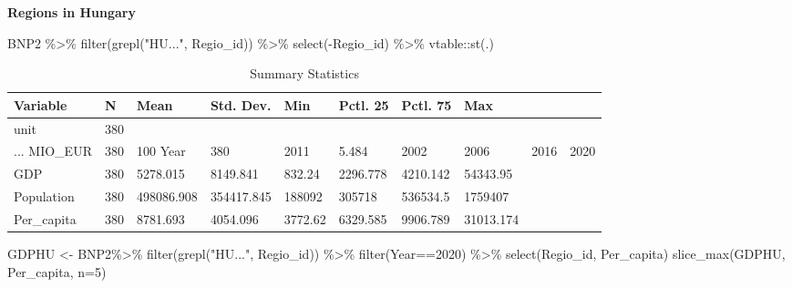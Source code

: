 \documentclass[
]{article}
\newenvironment{Shaded}{\begin{snugshade}}{\end{snugshade}}
\newcommand{\AttributeTok}[1]{\textcolor[rgb]{0.77,0.63,0.00}{#1}}
\newcommand{\DecValTok}[1]{\textcolor[rgb]{0.00,0.00,0.81}{#1}}
\newcommand{\FunctionTok}[1]{\textcolor[rgb]{0.00,0.00,0.00}{#1}}
\newcommand{\NormalTok}[1]{#1}
\newcommand{\OtherTok}[1]{\textcolor[rgb]{0.56,0.35,0.01}{#1}}
\newcommand{\SpecialCharTok}[1]{\textcolor[rgb]{0.00,0.00,0.00}{#1}}
\newcommand{\StringTok}[1]{\textcolor[rgb]{0.31,0.60,0.02}{#1}}
\begin{document}
\textbf{Regions in Hungary}

\begin{Shaded}
\begin{Highlighting}[]
\NormalTok{BNP2 }\SpecialCharTok{\%\textgreater{}\%}
  \FunctionTok{filter}\NormalTok{(}\FunctionTok{grepl}\NormalTok{(}\StringTok{"HU..."}\NormalTok{, Regio\_id)) }\SpecialCharTok{\%\textgreater{}\%}
  \FunctionTok{select}\NormalTok{(}\SpecialCharTok{{-}}\NormalTok{Regio\_id) }\SpecialCharTok{\%\textgreater{}\%}
\NormalTok{  vtable}\SpecialCharTok{::}\FunctionTok{st}\NormalTok{(.)}
\end{Highlighting}
\end{Shaded}

\begin{table}

\caption{\label{tab:unnamed-chunk-8}Summary Statistics}
\centering
\begin{tabular}[t]{llllllll}
\toprule
Variable & N & Mean & Std. Dev. & Min & Pctl. 25 & Pctl. 75 & Max\\
\midrule
unit & 380 &  &  &  &  &  & \\
... MIO_EUR & 380 & 100%
Year & 380 & 2011 & 5.484 & 2002 & 2006 & 2016 & 2020\\
GDP & 380 & 5278.015 & 8149.841 & 832.24 & 2296.778 & 4210.142 & 54343.95\\
Population & 380 & 498086.908 & 354417.845 & 188092 & 305718 & 536534.5 & 1759407\\
\addlinespace
Per_capita & 380 & 8781.693 & 4054.096 & 3772.62 & 6329.585 & 9906.789 & 31013.174\\
\bottomrule
\end{tabular}
\end{table}

\begin{Shaded}
\begin{Highlighting}[]
\NormalTok{GDPHU }\OtherTok{\textless{}{-}}\NormalTok{ BNP2}\SpecialCharTok{\%\textgreater{}\%}
  \FunctionTok{filter}\NormalTok{(}\FunctionTok{grepl}\NormalTok{(}\StringTok{"HU..."}\NormalTok{, Regio\_id)) }\SpecialCharTok{\%\textgreater{}\%}
  \FunctionTok{filter}\NormalTok{(Year}\SpecialCharTok{==}\DecValTok{2020}\NormalTok{) }\SpecialCharTok{\%\textgreater{}\%}
  \FunctionTok{select}\NormalTok{(Regio\_id, Per\_capita)}
\FunctionTok{slice\_max}\NormalTok{(GDPHU, Per\_capita, }\AttributeTok{n=}\DecValTok{5}\NormalTok{)}
\end{Highlighting}
\end{Shaded}
\end{document}
